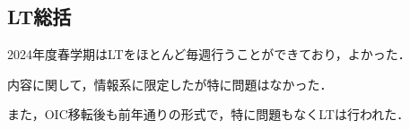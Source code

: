 \subsection*{LT総括}


2024年度春学期はLTをほとんど毎週行うことができており，よかった．

内容に関して，情報系に限定したが特に問題はなかった．

また，OIC移転後も前年通りの形式で，特に問題もなくLTは行われた．
